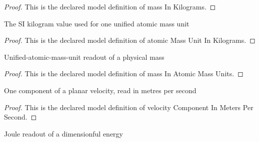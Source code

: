 \begin{proof}
  This is the declared model definition of mass In Kilograms.
\end{proof}
\begin{definition}
  \label{def:physics:phyx-mini-0618:phyxminiproblems-problemphyxmini0618-atomicmassunitinkilograms}
  The SI kilogram value used for one unified atomic mass unit
\end{definition}
\begin{proof}
  This is the declared model definition of atomic Mass Unit In Kilograms.
\end{proof}
\begin{definition}
  \label{def:physics:phyx-mini-0618:phyxminiproblems-problemphyxmini0618-massinatomicmassunits}
  Unified-atomic-mass-unit readout of a physical mass
\end{definition}
\begin{proof}
  This is the declared model definition of mass In Atomic Mass Units.
\end{proof}
\begin{definition}
  \label{def:physics:phyx-mini-0618:phyxminiproblems-problemphyxmini0618-velocitycomponentinmeterspersecond}
  One component of a planar velocity, read in metres per second
\end{definition}
\begin{proof}
  This is the declared model definition of velocity Component In Meters Per Second.
\end{proof}
\begin{definition}
  \label{def:physics:phyx-mini-0618:phyxminiproblems-problemphyxmini0618-energyinjoules}
  Joule readout of a dimensionful energy
\end{definition}
